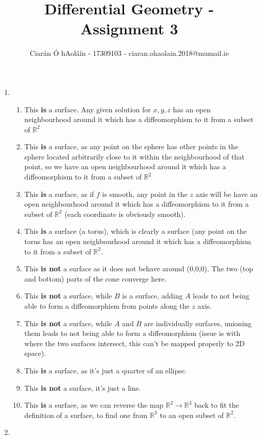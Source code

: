 \documentclass{article}
\title{Differential Geometry - Assignment 3}
\author{Ciarán Ó hAoláín - 17309103 - ciaran.ohaolain.2018@mumail.ie}
\newcommand{\R}{\mathbb{R}}
\theoremstyle{definition}
\theoremstyle{remark}
\theoremstyle{example}
\begin{document}
	\maketitle
	
	\begin{enumerate}
		\item \begin{enumerate}
			\item This \textbf{is} a surface. Any given solution for $x,y,z$ has an open neighbourhood around it which has a diffeomorphism to it from a subset of $\R^2$
			\item This \textbf{is} a surface, as any point on the sphere has other points in the sphere located arbitrarily close to it within the neighbourhood of that point, so we have an open neighbourhood around it which has a diffeomorphism to it from a subset of $\R^2$
			\item This \textbf{is} a surface, as if $f$ is smooth, any point in the $z$ axis will be have an open neighbourhood around it which has a diffeomorphism to it from a subset of $\R^2$ (each coordinate is obviously smooth).
			\item This \textbf{is} a surface (a torus), which is clearly a surface (any point on the torus has an open neighbourhood around it which has a diffeomorphism to it from a subset of $\R^2$.
			\item This \textbf{is not} a surface as it does not behave around (0,0,0). The two (top and bottom) parts of the cone converge here.
			\item This \textbf{is not} a surface, while $B$ is a surface, adding $A$ leads to not being able to form a diffeomorphism from points along the $z$ axis.
			\item This \textbf{is not} a surface, while $A$ and $B$ are individually surfaces, unioning them leads to not being able to form a diffeomorphism (issue is with where the two surfaces intersect, this can't be mapped properly to 2D space).
			\item This \textbf{is} a surface, as it's just a quarter of an ellipse.
			\item This \textbf{is not} a surface, it's just a line.
			\item This \textbf{is} a surface, as we can reverse the map $\R^2 \to \R^3$ back to fit the definition of a surface, to find one from $\R^3$ to an open subset of  $\R^2$.
		\end{enumerate}
		\item \begin{enumerate}

\end{enumerate}
\end{enumerate}
\end{document}
